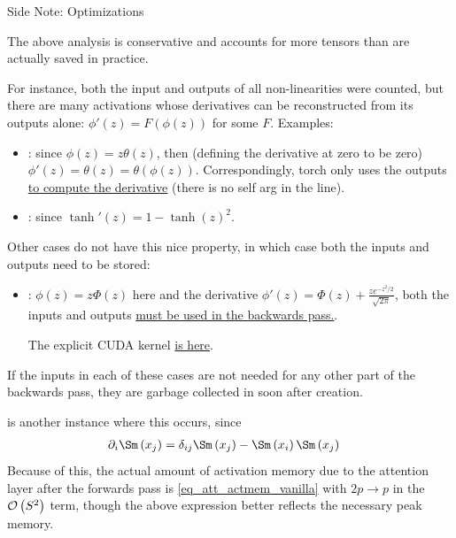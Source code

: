 \documentclass[11pt]{article}
\begin{document}
\begin{commentbox}{Side Note: Optimizations}

The above analysis is conservative and accounts for more tensors than are actually saved in
practice.\newline

For instance, both the input and outputs of all non-linearities were counted, but there are many
activations whose derivatives can be reconstructed from its outputs alone: $ \phi'(z)=F \left (
\phi(z) \right ) $ for some $ F $. Examples:
\begin{itemize}
    \item {}: since $ \phi(z)= z\theta(z) $, then (defining the derivative at zero to
        be zero) $ \phi'(z) =\theta(z) = \theta \left ( \phi(z) \right) $. Correspondingly, torch
        only uses the  outputs \href{https://github.com/pytorch/pytorch/blob/73d288fdf9d0beb76229cabc8566ee116f8a21a2/tools/autograd/derivatives.yaml#L2009-L2011}{to compute the derivative}
        (there is no self arg in the  line).
    \item  {}: since $ \tanh'(z)=1-\tanh(z) ^{ 2 } $.
\end{itemize}
Other cases do not have this nice property, in which case both the inputs and outputs need to
be stored:
\begin{itemize}
    \item {} \cite{hendrycks2023gaussian}: $ \phi(z)=z\Phi(z) $ here and the derivative
        $ \phi'(z)= \Phi(z) + \frac{ z e^{ -z ^{ 2 } /2 } }{\sqrt{2\pi}  } $, both the inputs and
        outputs \href{https://github.com/pytorch/pytorch/blob/73d288fdf9d0beb76229cabc8566ee116f8a21a2/tools/autograd/derivatives.yaml#L2041-L2044}{must be used in the backwards pass.}.

        The explicit CUDA kernel \href{https://github.com/pytorch/pytorch/blob/73d288fdf9d0beb76229cabc8566ee116f8a21a2/aten/src/ATen/native/cuda/ActivationGeluKernel.cu#L70-L84}{is here}.
\end{itemize}
If the inputs in each of these cases are not needed for any other part of the backwards pass, they
are garbage collected in  soon after creation.

\newline

 is another instance where this occurs, since
\begin{align}
     \partial _{ i } \Sm \left ( x _{ j } \right )  &= \delta _{ ij }\Sm \left ( x _{ j } \right ) -   \Sm \left ( x _{ i } \right )  \Sm \left ( x _{ j } \right ) \label{eq_softmax_derivative}
\end{align}
Because of this, the actual amount of activation memory due to the attention layer after the
forwards pass is \eqref{eq_att_actmem_vanilla} with $ 2p \longrightarrow p $ in the $ \mathcal{O} \left( S
^{ 2 } \right)  $ term, though the above expression better reflects the necessary peak memory.

\end{commentbox}
\end{document}

